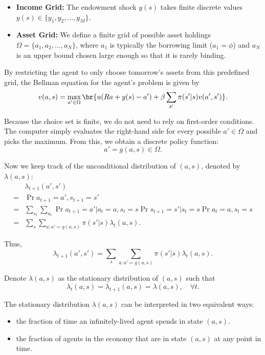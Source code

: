 \begin{itemize}
    \item \textbf{Income Grid:} The endowment shock $y(s)$ takes finite discrete values $y(s) \in \{y_1, y_2, \dots, y_M\}$.
    \item \textbf{Asset Grid:} We define a finite grid of possible asset holdings $\Omega = \{a_1, a_2, \dots, a_N\}$, where $a_1$ is typically the borrowing limit ($a_1 = \phi$) and $a_N$ is an upper bound chosen large enough so that it is rarely binding.
\end{itemize}

By restricting the agent to only choose tomorrow's assets from this predefined grid, the Bellman equation for the agent's problem is given by
\[
v(a,s) = \max_{a'\in \Omega} \br{u(Ra+y(s)-a')+\beta \sum_{s'}\pi(s'|s)v(a',s')}.
\]

Because the choice set is finite, we do not need to rely on first-order conditions. The computer simply evaluates the right-hand side for every possible $a' \in \Omega$ and picks the maximum. From this, we obtain a discrete policy function:
\[
a' = g(a,s)\in \Omega.
\]

Now we keep track of the unconditional distribution of $(a,s)$, denoted by $\lambda(a,s)$:
\[
\begin{aligned}
    & \lambda_{t+1}(a',s')\\
    = & \Pr{a_{t+1} = a' , s_{t+1} = s'}\\
     = & \sum_{s_t}\sum_{a_t}\Pr{a_{t+1} = a'|a_t = a,s_t = s}\Pr{s_{t+1} = s'|s_t = s}\Pr{a_t = a, s_t = s}\\
      = & \sum_{s}\sum_{a:a' = g(a,s)}\pi(s'|s)\lambda_t(a,s).
\end{aligned}
\]

Thus,
\[
\lambda_{t+1}(a',s') = \sum_{s}\sum_{a:a' = g(a,s)}\pi(s'|s)\lambda_t(a,s).
\]

Denote $\lambda(a,s)$ as the stationary distribution of $(a,s)$ such that 
\[
\lambda_t(a,s) = \lambda_{t+1}(a,s) = \lambda(a,s), \quad \forall t.
\]

The stationary distribution $\lambda(a,s)$ can be interpreted in two equivalent ways:
\begin{itemize}
    \item the fraction of time an infinitely-lived agent spends in state $(a,s)$.
    \item the fraction of agents in the economy that are in state $(a,s)$ at any point in time.
\end{itemize}

